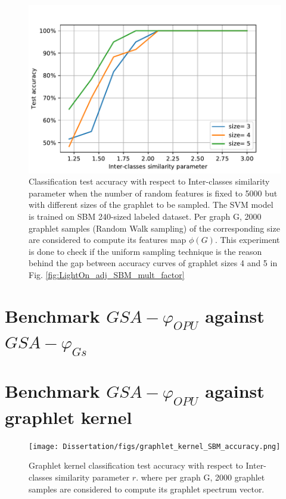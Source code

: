 \begin{figure}[H]
\centering
\includegraphics[scale=0.7]{Dissertation/figs/LightOn_adj_SBM_similarity_graphlet_size_RW.pdf}
\caption[Classification test accuracy as a function of Inter-classes similarity parameter ]{Classification test accuracy with respect to Inter-classes similarity parameter when the number of random features is fixed to 5000 but with different sizes of the graphlet to be sampled. The SVM model is trained on SBM 240-sized labeled dataset. Per graph G, 2000 graphlet samples (Random Walk sampling) of the corresponding size are considered to compute its features map $\phi(G)$. This experiment is done to check if the uniform sampling technique is the reason behind the gap between accuracy curves of graphlet sizes 4 and 5 in Fig. \ref{fig:LightOn_adj_SBM_mult_factor} }
\label{fig:LightOn_adj_SBM_multfactor_RW}
\end{figure}

\section{Benchmark $GSA-\varphi_{OPU}$ against $GSA-\varphi_{Gs}$}

\section{Benchmark $GSA-\varphi_{OPU}$ against graphlet kernel}
\begin{figure}[H]
\centering
\texttt{[image: Dissertation/figs/graphlet\_kernel\_SBM\_accuracy.png]}
\caption[Graphlet kernel classification test accuracy as a function of Inter-classes similarity parameter]{Graphlet kernel classification test accuracy with respect to Inter-classes similarity parameter $r$. where per graph G, 2000 graphlet samples are considered to compute its graphlet spectrum vector. }
\label{fig:graphlet_kernel_SBM}
\end{figure}

